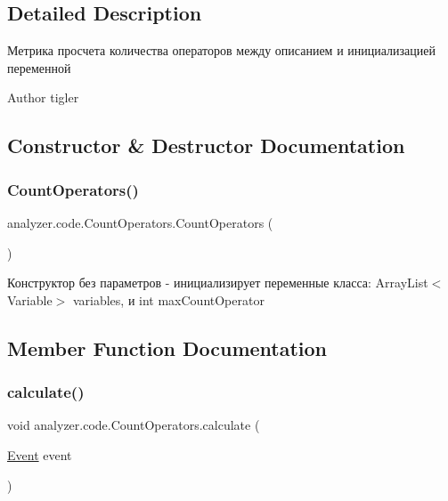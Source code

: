 \subsection{Detailed Description}
Метрика просчета количества операторов между описанием и инициализацией переменной \begin{DoxyAuthor}{Author}
tigler 
\end{DoxyAuthor}


\subsection{Constructor \& Destructor Documentation}
\mbox{\label{classanalyzer_1_1code_1_1CountOperators_a35cd40aef8c6e9b31aa51b667b7e3367}} 
\subsubsection{\texorpdfstring{Count\+Operators()}{CountOperators()}}
{\footnotesize\ttfamily analyzer.\+code.\+Count\+Operators.\+Count\+Operators (\begin{DoxyParamCaption}{ }\end{DoxyParamCaption})\hspace{0.3cm}{\ttfamily [inline]}}

Конструктор без параметров -\/ инициализирует переменные класса\+: Array\+List$<$\+Variable$>$ variables, и int max\+Count\+Operator 

\subsection{Member Function Documentation}
\mbox{\label{classanalyzer_1_1code_1_1CountOperators_a0dc10beb196cf80583707cbe4049eae2}} 
\subsubsection{\texorpdfstring{calculate()}{calculate()}}
{\footnotesize\ttfamily void analyzer.\+code.\+Count\+Operators.\+calculate (\begin{DoxyParamCaption}\item[{\hyperlink{classanalyzer_1_1code_1_1Event}{Event}}]{event }\end{DoxyParamCaption})\hspace{0.3cm}{\ttfamily [inline]}}

